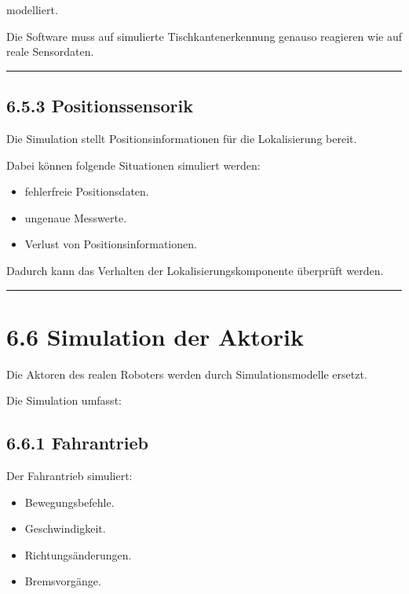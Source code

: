 \documentclass[
]{article}
\providecommand{\tightlist}{%
  \setlength{\itemsep}{0pt}\setlength{\parskip}{0pt}}
\begin{document}
modelliert.

Die Software muss auf simulierte Tischkantenerkennung genauso reagieren
wie auf reale Sensordaten.

\begin{center}\rule{0.5\linewidth}{0.5pt}\end{center}

\subsection{6.5.3 Positionssensorik}\label{positionssensorik}

Die Simulation stellt Positionsinformationen für die Lokalisierung
bereit.

Dabei können folgende Situationen simuliert werden:

\begin{itemize}
\tightlist
\item
  fehlerfreie Positionsdaten.
\item
  ungenaue Messwerte.
\item
  Verlust von Positionsinformationen.
\end{itemize}

Dadurch kann das Verhalten der Lokalisierungskomponente überprüft
werden.

\begin{center}\rule{0.5\linewidth}{0.5pt}\end{center}

\section{6.6 Simulation der Aktorik}\label{simulation-der-aktorik}

Die Aktoren des realen Roboters werden durch Simulationsmodelle ersetzt.

Die Simulation umfasst:

\subsection{6.6.1 Fahrantrieb}\label{fahrantrieb}

Der Fahrantrieb simuliert:

\begin{itemize}
\tightlist
\item
  Bewegungsbefehle.
\item
  Geschwindigkeit.
\item
  Richtungsänderungen.
\item
  Bremsvorgänge.
\end{itemize}
\end{document}
